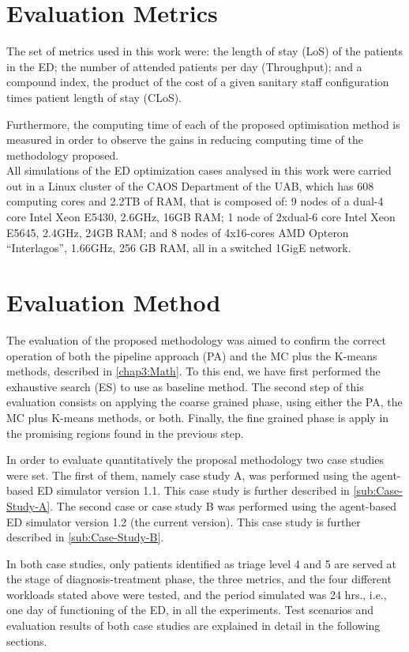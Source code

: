 \section{Evaluation Metrics}

The set of metrics used in this work were: the length of stay (LoS)
of the patients in the ED; the number of attended patients per day
(Throughput); and a compound index, the product of the cost of a given
sanitary staff configuration times patient length of stay (CLoS).

Furthermore, the computing time of each of the proposed optimisation
method is measured in order to observe the gains in reducing computing
time of the methodology proposed.\\


All simulations of the ED optimization cases analysed in this work
were carried out in a Linux cluster of the CAOS Department of the
UAB, which has 608 computing cores and 2.2TB of RAM, that is composed
of: 9 nodes of a dual-4 core Intel Xeon E5430, 2.6GHz, 16GB RAM; 1
node of 2xdual-6 core Intel Xeon E5645, 2.4GHz, 24GB RAM; and 8 nodes
of 4x16-cores AMD Opteron ``Interlagos'', 1.66GHz, 256 GB RAM, all
in a switched 1GigE network.


\section{Evaluation Method}

The evaluation of the proposed methodology was aimed to confirm the
correct operation of both the pipeline approach (PA) and the MC plus
the K-means methods, described in \ref{chap3:Math}. To this end,
we have first performed the exhaustive search (ES) to use as baseline
method. The second step of this evaluation consists on applying the
coarse grained phase, using either the PA, the MC plus K-means methods,
or both. Finally, the fine grained phase is apply in the promising
regions found in the previous step. 

In order to evaluate quantitatively the proposal methodology two case
studies were set. The first of them, namely case study A, was performed
using the agent-based ED simulator version 1.1. This case study is
further described in \ref{sub:Case-Study-A}. The second case or case
study B was performed using the agent-based ED simulator version 1.2
(the current version). This case study is further described in \ref{sub:Case-Study-B}.

In both case studies, only patients identified as triage level 4 and
5 are served at the stage of diagnosis-treatment phase, the three
metrics, and the four different workloads stated above were tested,
and the period simulated was 24 hrs., i.e., one day of functioning
of the ED, in all the experiments. Test scenarios and evaluation results
of both case studies are explained in detail in the following sections.\\


